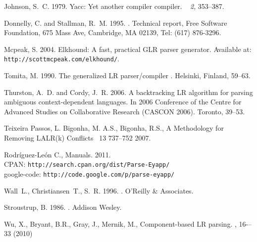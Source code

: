 
{\sc Johnson, S.~C.} 1979.
\newblock Yacc: Yet another compiler compiler.
~{\em
  2}, 353--387.

{\sc Donnelly, C.} {\sc and} {\sc Stallman, R.~M.} 1995.
.
\newblock Technical report, {F}ree {S}oftware {F}oundation, 675 Mass Ave,
  Cambridge, MA 02139, Tel: (617) 876-3296.

{\sc Mcpeak, S.} 2004.
\newblock Elkhound: A fast, practical GLR parser generator.
\newblock Available at: {\tt http://scottmcpeak.com/elkhound/}.

{\sc Tomita, M.} 1990.
\newblock The generalized LR parser/compiler 
. Helsinki, Finland, 59--63.

{\sc Thurston, A.~D.} {\sc and} {\sc Cordy, J.~R.} 2006.
\newblock A backtracking LR algorithm for parsing ambiguous context-dependent
  languages.
\newblock In { 2006 Conference of the Centre for Advanced Studies on
  Collaborative Research (CASCON 2006)}. Toronto, 39--53.

{\sc Teixeira Passos, L. Bigonha, M. A.S.,  Bigonha, R.S.},
\newblock A Methodology for Removing LALR(k) Conflicts
~{13} 737--752 2007.

{\sc Rodr\'iguez-Le\'on C.},
 Manuals. 2011.
\newblock \\CPAN: {\tt http://search.cpan.org/dist/Parse-Eyapp/ } 
\newblock \\google-code: {\tt http://code.google.com/p/parse-eyapp/ } 

{\sc Wall~L., Christiansen~T., S.~R.} 1996.
.
\newblock O'Reilly \& Associates.

{\sc Stroustrup, B.} 1986.
.
\newblock Addison Wesley.

{\sc Wu, X., Bryant, B.R., Gray, J., Mernik, M.},
\newblock Component-based LR parsing.
, 16-–33 (2010)

